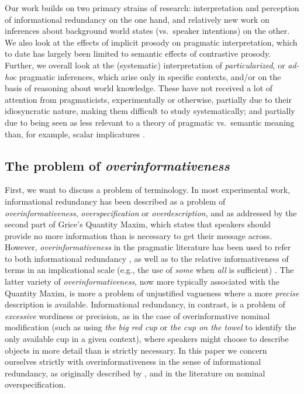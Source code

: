 Our work builds on two primary strains of research: interpretation and
perception of informational redundancy on the one hand, and relatively
new work on inferences about background world states (vs.~speaker
intentions) on the other. We also look at the effects of implicit
prosody on pragmatic interpretation, which to date has largely been
limited to semantic effects of contrastive prosody. Further, we overall
look at the (systematic) interpretation of \emph{particularized}, or
\emph{ad-hoc} pragmatic inferences, which arise only in specific
contexts, and/or on the basis of reasoning about world knowledge. These
have not received a lot of attention from pragmaticists, experimentally
or otherwise, partially due to their idiosyncratic nature, making them
difficult to study systematically; and partially due to being seen as
less relevant to a theory of pragmatic vs.~semantic meaning than, for
example, scalar implicatures \citep{Levinson2000}.

\subsection{\texorpdfstring{The problem of
\emph{overinformativeness}}{The problem of overinformativeness}}\label{the-problem-of-overinformativeness}

First, we want to discuss a problem of terminology. In most experimental
work, informational redundancy has been described as a problem of
\emph{overinformativeness}, \emph{overspecification} or
\emph{overdescription}, and as addressed by the second part of Grice's
Quantity Maxim, which states that speakers should provide no more
information than is necessary to get their message across. However,
\emph{overinformativeness} in the pragmatic literature has been used to
refer to both informational redundancy \citep{Engelhardt2006, Grice1975}, as well as to the relative informativeness of terms in an
implicational scale (e.g., the use of \emph{some} when \emph{all} is
sufficient) \citep{Horn1984, Levinson2000}. The latter variety of
\emph{overinformativeness}, now more typically associated with the
Quantity Maxim, is more a problem of unjustified vagueness where a more
\emph{precise} description is available. Informational redundancy, in
contrast, is a problem of \emph{excessive} wordiness or precision, as in
the case of overinformative nominal modification (such as using
\emph{the big red cup} or \emph{the cup on the towel} to identify the
only available cup in a given context), where speakers might choose to
describe objects in more detail than is strictly necessary. In this
paper we concern ourselves strictly with overinformativeness in the
sense of informational redundancy, as originally described by \citet{Grice1975}, and in the literature on nominal overspecification.

